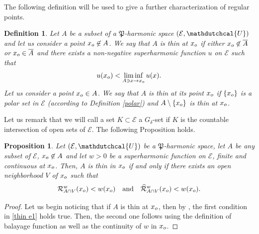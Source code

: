 \documentclass{amsart}
\newtheorem{prop}[thm]{Proposition}
\newtheorem{defn}[thm]{Definition}
\numberwithin{equation}{section}
\def \Ec{{\mathcal{E}}}
\def \Ud{{\mathdutchcal{U}}}
\def \reduit{{\mathcal{R}}}
\def \balayage{{\widehat{\mathcal{R}}}}
\begin{document}
{The following definition will be used to give a further characterization of regular points.
\begin{defn}\label{thinnes}
Let $A$  be a subset of a $\mathfrak{P}$-harmonic space $(\Ec,\Ud)$ and let us consider a point $x_{\rm o} \not \in A$. We say that $A$ is \textup{thin} at $x_{\rm o}$ if either $x_{\rm o} \not \in \overline{A}$ or $x_{\rm o} \in \overline{A}$ and there exists a non-negative superharmonic function $u$ on $\Ec$ such that
\begin{equation*}
u(x_{\rm o})<\liminf_{A \ni x \rightarrow x_{\rm o}}u(x).
\end{equation*}
Let us consider a point $x_{\rm o} \in A$. We say that $A$ is \textup{thin} at its point $x_{\rm o}$ if $\{x_{\rm o}\}$ is a polar set in $\Ec$ (according to Definition \textup{\ref{polar}}) and $A \setminus \{x_{\rm o}\}$ is thin at $x_{\rm o}$.
\end{defn}
{
Let us remark that we will call a set $K \subset \Ec$ a $G_\delta$-set if $K$ is the countable intersection of open sets of $\Ec$. The following Proposition holds.
\begin{prop}\label{thin prop1}
Let $(\Ec,\Ud)$ be a $\mathfrak{P}$-harmonic space, let $A$ be any subset of $\Ec$, $x_{\rm o} \not \in A$ and let $w>0$ be a {superharmonic} function on $\Ec$, finite and continuous at $x_{\rm o}$. Then, $A$ is thin in $x_{\rm o}$ if and only if  there exists an open neighborhood $V$ of $x_{\rm o}$ such that
\begin{equation}\label{thin e1}
\reduit^w_{A \cap V} (x_{\rm o}) < w(x_{\rm o}) \quad \text{and} \quad \balayage^w_{A \cap V} (x_{\rm o}) < w(x_{\rm o}).
\end{equation}
\end{prop}
\begin{proof}
Let us begin noticing that if $A$ is thin at $x_{\rm o}$, then by \cite[Theorem 29]{Bre60}, the first condition in \eqref{thin e1} holds true. Then, the second one follows using the definition of balayage function as well as the continuity of $w$ in $x_{\rm o}$.


\end{proof}}}
\end{document}
